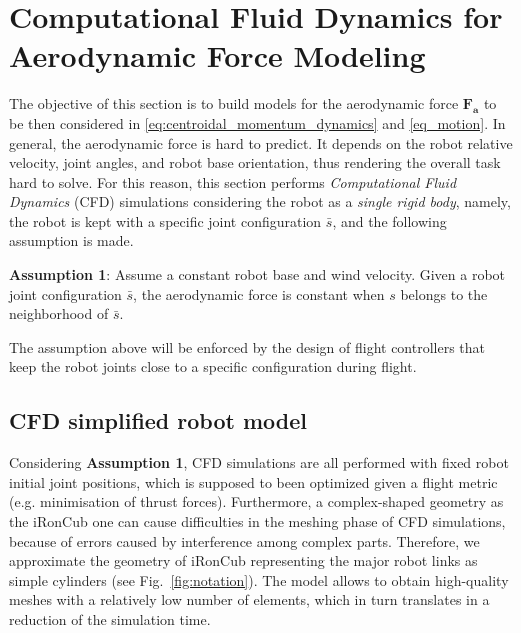 \section{Computational Fluid Dynamics for Aerodynamic Force Modeling}
\label{methods}
The objective of this section is to build models for the aerodynamic force $\boldsymbol{F_a}$ to be then considered in \eqref{eq:centroidal_momentum_dynamics} and \eqref{eq_motion}. In general, the aerodynamic force is hard to predict. It depends on the robot relative velocity, joint angles, and robot base orientation, thus rendering the overall task hard to solve. For this reason, this section performs \emph{Computational Fluid Dynamics} (CFD) simulations considering the robot as a \emph{single rigid body}, namely, the robot is kept with a specific joint configuration $\bar{s}$, and the following assumption is made.

\textbf{Assumption 1}: Assume a constant robot base and wind velocity. Given a robot joint configuration $\bar{s}$,
 the aerodynamic force is constant 
when $s$ belongs to the neighborhood of $\bar{s}$.

The assumption above will be enforced by the design of flight controllers that keep the robot joints close to a specific configuration during flight.   
  
  
\subsection{CFD simplified robot model}
\label{sec:cfdModel}
 Considering \textbf{Assumption 1}, CFD simulations are all performed with fixed robot initial joint positions, which is supposed to been optimized given a flight metric (e.g. minimisation of thrust forces).
 Furthermore, a complex-shaped geometry as the iRonCub one can cause difficulties in the meshing phase of CFD simulations, because of errors caused by interference among complex parts. Therefore, 
 we approximate the geometry of iRonCub representing the major robot links as simple cylinders (see Fig.~\ref{fig:notation}). The model allows to obtain high-quality meshes with a relatively low number of elements, which in turn translates in a reduction of the simulation time.
 
